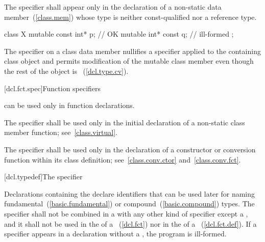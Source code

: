 \pnum
The  specifier shall appear only in the declaration of
a non-static data member~(\ref{class.mem})
whose type is neither const-qualified nor a reference type.
\begin{example}

\begin{codeblock}
class X {
  mutable const int* p;         // OK
  mutable int* const q;         // ill-formed
};
\end{codeblock}
\end{example}

\pnum
The  specifier on a class data member nullifies a
 specifier applied to the containing class object and
permits modification of the mutable class member even though the rest of
the object is ~(\ref{dcl.type.cv}).

[dcl.fct.spec]{Function specifiers}%
%

\pnum
{}
can be used only in function declarations.

\begin{bnf}
\br
    \br
\end{bnf}

\pnum
{}%
The  specifier shall be used only in the initial
declaration of a non-static class member function;
see~\ref{class.virtual}.

\pnum
{}%
The  specifier shall be used only in the declaration of
a constructor or conversion function within its class definition;
see~\ref{class.conv.ctor} and~\ref{class.conv.fct}.

[dcl.typedef]{The  specifier}%

\pnum
Declarations containing the  
declare identifiers that can be used later for naming
fundamental~(\ref{basic.fundamental}) or compound~(\ref{basic.compound})
types. The  specifier shall not be
combined in a  with any other kind of
specifier except a , and it shall not be used in the
 of a
~(\ref{dcl.fct}) nor in the
 of a
~(\ref{dcl.fct.def}).
If a  specifier appears in a declaration without a ,
the program is ill-formed.

